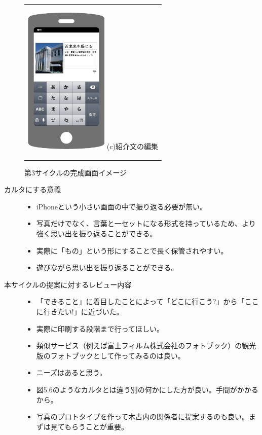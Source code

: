 \begin{figure}[htbp]
\begin{center}
\begin{tabular}{c}
      \begin{minipage}{0.33\hsize}
        \begin{center}
\includegraphics[width=4cm, bb=0 0 320 548]{appIdea3.png}
          \hspace{1cm} %
          {\footnotesize (c)紹介文の編集}
        \end{center}
      \end{minipage}

    \end{tabular}
    \caption{第3サイクルの完成画面イメージ}
    \label{fig:lena}
  \end{center}
\end{figure}

\begin{description}
\item[カルタにする意義]\mbox{}
 \begin{itemize}
 \item iPhoneという小さい画面の中で振り返る必要が無い。
 \item 写真だけでなく、言葉と一セットになる形式を持っているため、より強く思い出を振り返ることができる。
 \item 実際に「もの」という形にすることで長く保管されやすい。
 \item 遊びながら思い出を振り返ることができる。
 \end{itemize}
\item[本サイクルの提案に対するレビュー内容]\mbox{}
 \begin{itemize}
 \item 「できること」に着目したことによって「どこに行こう?」から「ここに行きたい!」に近づいた。
 \item 実際に印刷する段階まで行ってほしい。
 \item 類似サービス（例えば富士フィルム株式会社のフォトブック\cite{FUJI}）の観光版のフォトブックとして作ってみるのは良い。
 \item ニーズはあると思う。
 \item 図5.6のようなカルタとは違う別の何かにした方が良い。手間がかかるから。
 \item 写真のプロトタイプを作って木古内の関係者に提案するのも良い。まずは見てもらうことが重要。
 \end{itemize}
\end{description}


